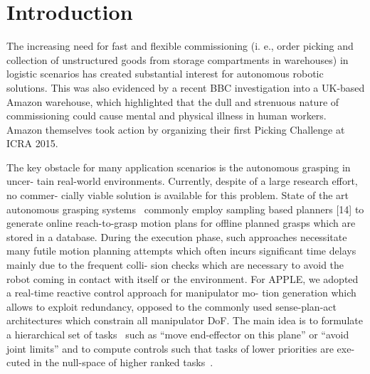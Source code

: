 \section{Introduction}
\label{sec:intro}
%
The increasing need for fast and flexible commissioning (i. e., order picking and collection of
unstructured goods from storage compartments in warehouses) in logistic scenarios has created
substantial interest for autonomous robotic solutions. This was also evidenced by a recent BBC
investigation into a UK-based Amazon warehouse, which highlighted that the dull and strenuous nature
of commissioning could cause mental and physical illness in human workers. Amazon themselves took
action by organizing their first Picking Challenge at ICRA 2015.

The key obstacle for many application scenarios is the autonomous grasping in uncer- tain real-world
environments. Currently, despite of a large research effort, no commer- cially viable solution is
available for this problem. State of the art autonomous grasping
systems~\cite{Bere07, Srin10, Krug14_1} commonly employ sampling based planners [14] to generate
online reach-to-grasp motion plans for offline planned grasps which are stored in a database.
During the execution phase, such approaches necessitate many futile motion planning attempts which
often incurs significant time delays mainly due to the frequent colli- sion checks which are
necessary to avoid the robot coming in contact with itself or the environment.  For APPLE, we
adopted a real-time reactive control approach for manipulator mo- tion generation which allows to
exploit redundancy, opposed to the commonly used sense-plan-act architectures which constrain all
manipulator DoF. The main idea is to formulate a hierarchical set of tasks~\cite{Sams91} such as “move
end-effector on this plane” or “avoid joint limits” and to compute controls such that tasks of lower
priorities are exe- cuted in the null-space of higher ranked tasks~\cite{Sici91, Khat04, Sent10}.
